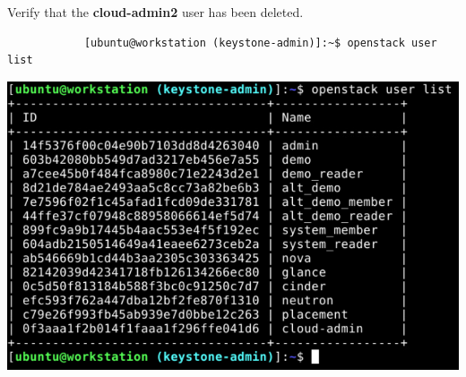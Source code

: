 \documentclass[letterpaper, 12pt]{article}
\begin{document}
\begin{enumerate}
    \begin{labstep}
        Verify that the \textbf{cloud-admin2} user has been deleted.
        \begin{lstlisting}
            [ubuntu@workstation (keystone-admin)]:~$ openstack user list
        \end{lstlisting}

        \begin{center}
            \includegraphics[width=\linewidth]{images/appendix/step11.png}
        \end{center}
    \end{labstep}

\end{enumerate}
\end{document}
